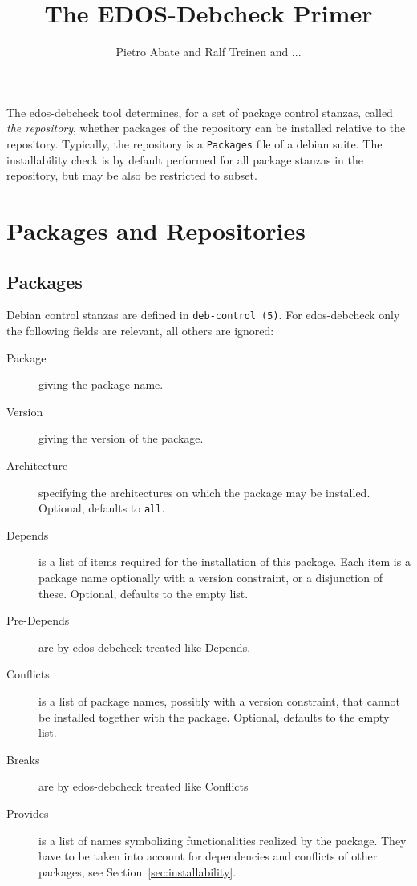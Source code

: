 \documentclass{article}
\title{The EDOS-Debcheck Primer}
\author{Pietro Abate and Ralf Treinen and ...}
\newcommand{\debcheck}{edos-debcheck}
\begin{document}
\maketitle

The \debcheck{} tool determines, for a set of package control stanzas,
called \emph{the repository}, whether packages of the repository can
be installed relative to the repository. Typically, the repository is
a \texttt{Packages} file of a debian suite. The installability check
is by default performed for all package stanzas in the repository, but
may be also be restricted to subset.

\tableofcontents

\section{Packages and Repositories}
\label{sec:packages}
\subsection{Packages}
Debian control stanzas are defined in \texttt{deb-control (5)}. For
\debcheck{} only the following fields are relevant, all others are
ignored:
\begin{description}
\item[Package] giving the package name.
\item[Version] giving the version of the package.
\item[Architecture] specifying the architectures on which the package
  may be installed. Optional, defaults to \texttt{all}.
\item[Depends] is a list of items required for the installation of
  this package. Each item is a package name optionally with a version
  constraint, or a disjunction of these. Optional, defaults to the
  empty list.
\item[Pre-Depends] are by \debcheck{} treated like Depends.
\item[Conflicts] is a list of package names, possibly with a version
  constraint, that cannot be installed together with the package. Optional,
  defaults to the empty list.
\item[Breaks] are by \debcheck{} treated like Conflicts
\item[Provides] is a list of names symbolizing functionalities realized by the
  package. They have to be taken into account for dependencies and conflicts
  of other packages, see Section~\ref{sec:installability}.
\end{description}
\end{document}
